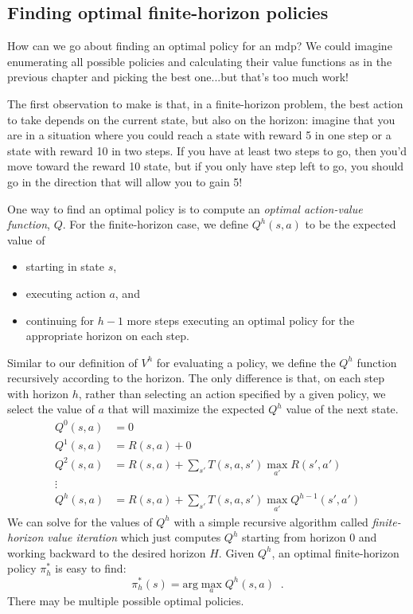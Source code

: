 \subsection{Finding optimal finite-horizon policies}

\label{sec:mdp_finite_horizon_optimal}

How can we go about finding an optimal policy for an {\sc mdp}?  We
could imagine enumerating all possible policies and calculating their
value functions as in the previous chapter and picking the best
one...but that's too much work!

The first observation to make is that, in a finite-horizon problem,
the best action to take depends on the current state, but also on the
horizon:  imagine that you are in a situation where you could reach a
state with reward 5 in one step or a state with reward 10 in two
steps.  If you have at least two steps to go, then you'd move toward
the reward 10 state, but if you only have step left to go, you should
go in the direction that  will  allow you to gain 5!

One way to find an optimal policy is to compute an {\em  optimal
  action-value function}, $Q$.  For the finite-horizon case, we define 
$Q^h(s, a)$ to be the expected value of 
\begin{itemize}
\item starting in state $s$,
\item executing action $a$, and
\item continuing for $h - 1$ more steps executing an optimal policy
  for the appropriate horizon on each step.
\end{itemize}
Similar to our definition of $V^h$ for evaluating a policy, we define
the $Q^h$ function recursively according to the horizon.  The only
difference is that, on each step with horizon $h$, rather than
selecting an action specified by a given  policy, we select the value
of $a$ that will maximize the expected $Q^h$ value of the next state.
\begin{align}
Q^0(s, a) &= 0\\
Q^1(s, a) &= R(s, a) + 0\\
Q^2(s, a) &= R(s, a) + \sum_{s'}T(s, a, s') \max_{a'} R(s', a')\\
\vdots
\nonumber \\
Q^h(s, a) &= R(s, a) + \sum_{s'}T(s, a, s') \max_{a'} Q^{h - 1}(s', a')
\end{align}
We can solve for the values of $Q^h$ with a simple recursive algorithm
called {\it{finite-horizon value iteration}} which just computes $Q^h$ starting
from horizon 0 and working backward to the desired horizon
$H$. Given $Q^h$, an optimal finite-horizon policy $\pi_h^*$ is easy to find: 
\begin{equation}
 \pi_h^*(s) = \text{arg}\max_{a}Q^h(s, a) \;\;.
\end{equation}
There may be multiple possible optimal policies.

